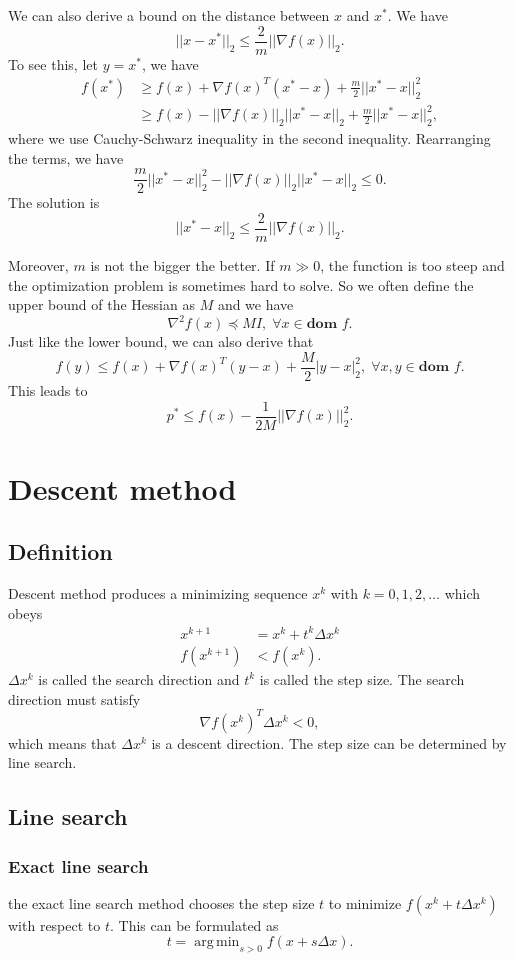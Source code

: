 \documentclass[lang=en,color=blue,mode=fancy,titlestyle=hang]{elegantbook}
\DeclareMathOperator*{\argmin}{arg\,min}
\begin{document}
We can also derive a bound on the distance between $x$ and $x^*$. We have
\[
||x - x^*||_2 \leq \frac{2}{m} ||\nabla f(x)||_2.
\]
To see this, let $y=x^*$, we have
\begin{align*}
  f(x^*) &\geq f(x) + \nabla f(x)^T (x^* - x) + \frac{m}{2} ||x^* - x||_2^2\\
  &\geq f(x) - ||\nabla f(x)||_2 ||x^* - x||_2 + \frac{m}{2} ||x^* - x||_2^2,
\end{align*}
where we use Cauchy-Schwarz inequality in the second inequality. Rearranging the terms, we have
\[
\frac{m}{2} ||x^* - x||_2^2 - ||\nabla f(x)||_2 ||x^* - x||_2 \leq 0.
\]
The solution is
\[
||x^* - x||_2 \leq \frac{2}{m} ||\nabla f(x)||_2.
\]

Moreover, $m$ is not the bigger the better. If $m \gg 0$, the function is too steep and the optimization
problem is sometimes hard to solve. So we often define the upper bound of the Hessian as $M$
and we have
\[
\nabla^2 f(x) \preceq M I, \; \forall x \in \textbf{dom } f.
\]
Just like the lower bound, we can also derive that
\[
f(y) \leq f(x) + \nabla f(x)^T (y - x) + \frac{M}{2} |y - x|_2^2, \; \forall x, y \in \textbf{dom } f.
\]
This leads to
\[
p^* \leq f(x) - \frac{1}{2M} ||\nabla f(x)||_2^2.
\]

\section{Descent method}
\subsection{Definition}
Descent method produces a minimizing sequence $x^k$ with $k = 0, 1, 2, \ldots$ which obeys
\begin{align*}
x^{k+1} &= x^k + t^k \Delta x^k\\
f(x^{k+1}) &< f(x^k).
\end{align*}
$\Delta x^k$ is called the search direction and $t^k$ is called the step size. The search direction
must satisfy
\[
\nabla f(x^k)^T \Delta x^k < 0,
\]
which means that $\Delta x^k$ is a descent direction. The step size can be determined by line search.

\subsection{Line search}
\subsubsection{Exact line search} the exact line search method chooses the step size $t$
to minimize $f(x^k + t \Delta x^k)$ with respect to $t$. This can be formulated as
\[
t = \argmin_{s > 0} f(x + s \Delta x).
\]
\end{document}
